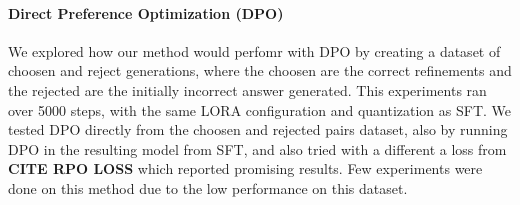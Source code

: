 \documentclass[a4paper,10pt]{article}
\begin{document}
\paragraph{Direct Preference Optimization (DPO)}
We explored how our method would perfomr with DPO by creating a dataset of choosen and reject generations, where the choosen are the correct refinements and the rejected are the initially incorrect answer generated. This experiments ran over 5000 steps, with the same LORA configuration and quantization as SFT. We tested DPO directly from the choosen and rejected pairs dataset, also by running DPO in the resulting model from SFT, and also tried with a different a loss from \textbf{CITE RPO LOSS} which reported promising results. Few experiments were done on this method due to the low performance on this dataset.
\end{document}

